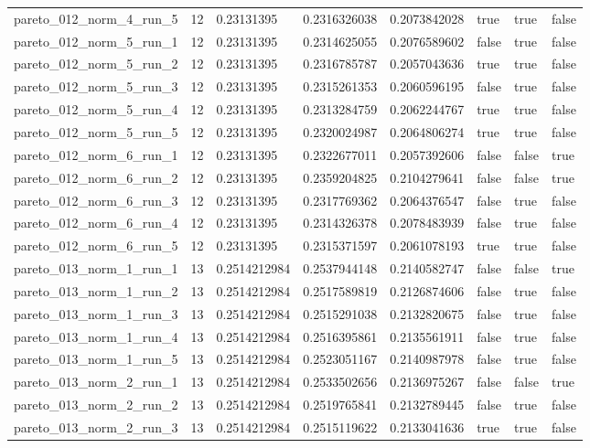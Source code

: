 \begin{tabular}{@{}llllllll@{}}
pareto\_012\_norm\_4\_run\_5 & 12 & 0.23131395 & 0.2316326038 & 0.2073842028 & true & true & false \\
pareto\_012\_norm\_5\_run\_1 & 12 & 0.23131395 & 0.2314625055 & 0.2076589602 & false & true & false \\
pareto\_012\_norm\_5\_run\_2 & 12 & 0.23131395 & 0.2316785787 & 0.2057043636 & true & true & false \\
pareto\_012\_norm\_5\_run\_3 & 12 & 0.23131395 & 0.2315261353 & 0.2060596195 & false & true & false \\
pareto\_012\_norm\_5\_run\_4 & 12 & 0.23131395 & 0.2313284759 & 0.2062244767 & true & true & false \\
pareto\_012\_norm\_5\_run\_5 & 12 & 0.23131395 & 0.2320024987 & 0.2064806274 & true & true & false \\
pareto\_012\_norm\_6\_run\_1 & 12 & 0.23131395 & 0.2322677011 & 0.2057392606 & false & false & true \\
pareto\_012\_norm\_6\_run\_2 & 12 & 0.23131395 & 0.2359204825 & 0.2104279641 & false & false & true \\
pareto\_012\_norm\_6\_run\_3 & 12 & 0.23131395 & 0.2317769362 & 0.2064376547 & false & true & false \\
pareto\_012\_norm\_6\_run\_4 & 12 & 0.23131395 & 0.2314326378 & 0.2078483939 & false & true & false \\
pareto\_012\_norm\_6\_run\_5 & 12 & 0.23131395 & 0.2315371597 & 0.2061078193 & true & true & false \\
pareto\_013\_norm\_1\_run\_1 & 13 & 0.2514212984 & 0.2537944148 & 0.2140582747 & false & false & true \\
pareto\_013\_norm\_1\_run\_2 & 13 & 0.2514212984 & 0.2517589819 & 0.2126874606 & false & true & false \\
pareto\_013\_norm\_1\_run\_3 & 13 & 0.2514212984 & 0.2515291038 & 0.2132820675 & false & true & false \\
pareto\_013\_norm\_1\_run\_4 & 13 & 0.2514212984 & 0.2516395861 & 0.2135561911 & false & true & false \\
pareto\_013\_norm\_1\_run\_5 & 13 & 0.2514212984 & 0.2523051167 & 0.2140987978 & false & true & false \\
pareto\_013\_norm\_2\_run\_1 & 13 & 0.2514212984 & 0.2533502656 & 0.2136975267 & false & false & true \\
pareto\_013\_norm\_2\_run\_2 & 13 & 0.2514212984 & 0.2519765841 & 0.2132789445 & false & true & false \\
pareto\_013\_norm\_2\_run\_3 & 13 & 0.2514212984 & 0.2515119622 & 0.2133041636 & true & true & false \\

\end{tabular}
